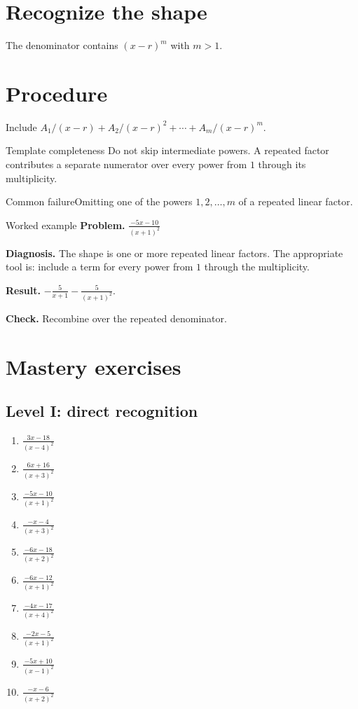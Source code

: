 \documentclass[11pt,oneside]{book}
\begin{document}
\section{Recognize the shape}
The denominator contains $(x-r)^m$ with $m>1$.
\section{Procedure}
Include $A_1/(x-r)+A_2/(x-r)^2+\cdots+A_m/(x-r)^m$.

\begin{warningbox}{Template completeness}
Do not skip intermediate powers. A repeated factor contributes a separate numerator over every power from $1$ through its multiplicity.
\end{warningbox}
\begin{warningbox}{Common failure}Omitting one of the powers $1,2,\ldots,m$ of a repeated linear factor.\end{warningbox}
\begin{examplebox}{Worked example}
\textbf{Problem.} $\displaystyle \frac{- 5 x - 10}{\left(x + 1\right)^{2}}$

\textbf{Diagnosis.} The shape is one or more repeated linear factors. The appropriate tool is: include a term for every power from $1$ through the multiplicity.

\textbf{Result.} $\displaystyle - \frac{5}{x + 1} - \frac{5}{\left(x + 1\right)^{2}}$.

\textbf{Check.} Recombine over the repeated denominator.
\end{examplebox}
\section{Mastery exercises}
\subsection*{Level I: direct recognition}
\begin{enumerate}[leftmargin=*,label=\textbf{\arabic*.},itemsep=0.65\baselineskip]
\item $\displaystyle \frac{3 x - 18}{\left(x - 4\right)^{2}}$
\item $\displaystyle \frac{6 x + 16}{\left(x + 3\right)^{2}}$
\item $\displaystyle \frac{- 5 x - 10}{\left(x + 1\right)^{2}}$
\item $\displaystyle \frac{- x - 4}{\left(x + 3\right)^{2}}$
\item $\displaystyle \frac{- 6 x - 18}{\left(x + 2\right)^{2}}$
\item $\displaystyle \frac{- 6 x - 12}{\left(x + 1\right)^{2}}$
\item $\displaystyle \frac{- 4 x - 17}{\left(x + 4\right)^{2}}$
\item $\displaystyle \frac{- 2 x - 5}{\left(x + 1\right)^{2}}$
\item $\displaystyle \frac{- 5 x + 10}{\left(x - 1\right)^{2}}$
\item $\displaystyle \frac{- x - 6}{\left(x + 2\right)^{2}}$
\end{enumerate}
\end{document}
